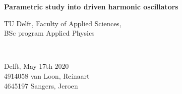 \begin{titlepage}

\newcommand{\HRule}{\rule{\linewidth}{0.5mm}} %

\center


{ \huge \bfseries Parametric study into driven harmonic oscillators }\\[1cm] %






\vfill
\begin{minipage}{0.4\textwidth}
    \begin{flushleft}
        TU Delft, Faculty of Applied Sciences,\\
        BSc program Applied Physics
    \end{flushleft}
\end{minipage}
~
\begin{minipage}{0.4\textwidth}
    \begin{flushright}
        Delft, May 17th 2020\\
        4914058 \hspace{1cm} van Loon, Reinaart\\
        4645197 \hspace{1cm} Sangers, Jeroen
    \end{flushright}
\end{minipage}\\[1.5cm]


\end{titlepage}
